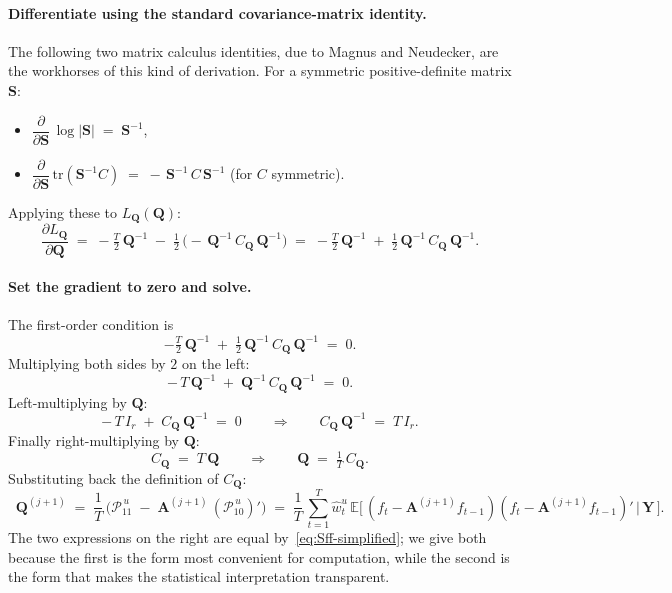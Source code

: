\documentclass[11pt, a4paper, oneside]{article}
\newcommand{\mY}{\mathbf{Y}}
\newcommand{\mA}{\mathbf{A}}
\newcommand{\mQ}{\mathbf{Q}}
\begin{document}
\paragraph{Differentiate using the standard covariance-matrix identity.}
The following two matrix calculus identities, due to Magnus and
Neudecker, are the workhorses of this kind of derivation. For a
symmetric positive-definite matrix $\mathbf{S}$:
\begin{itemize}[leftmargin=1.5em, itemsep=2pt]
    \item $\dfrac{\partial}{\partial \mathbf{S}}\, \log|\mathbf{S}| \;=\; \mathbf{S}^{-1}$,
    \item $\dfrac{\partial}{\partial \mathbf{S}}\, \mathrm{tr}(\mathbf{S}^{-1} C) \;=\; -\,\mathbf{S}^{-1}\, C\, \mathbf{S}^{-1}$ \quad (for $C$ symmetric).
\end{itemize}
Applying these to $L_{\mQ}(\mQ)$:
\[
\frac{\partial L_{\mQ}}{\partial \mQ}
\;=\; -\tfrac{T}{2}\, \mQ^{-1}
\;-\; \tfrac{1}{2}\,\big(-\, \mQ^{-1}\, C_{\mQ}\, \mQ^{-1}\big)
\;=\; -\tfrac{T}{2}\, \mQ^{-1} \;+\; \tfrac{1}{2}\, \mQ^{-1}\, C_{\mQ}\, \mQ^{-1}.
\]

\paragraph{Set the gradient to zero and solve.}
The first-order condition is
\[
-\tfrac{T}{2}\, \mQ^{-1} \;+\; \tfrac{1}{2}\, \mQ^{-1}\, C_{\mQ}\, \mQ^{-1} \;=\; 0.
\]
Multiplying both sides by $2$ on the left:
\[
-\, T\, \mQ^{-1} \;+\; \mQ^{-1}\, C_{\mQ}\, \mQ^{-1} \;=\; 0.
\]
Left-multiplying by $\mQ$:
\[
-\, T\, I_r \;+\; C_{\mQ}\, \mQ^{-1} \;=\; 0
\qquad\Longrightarrow\qquad
C_{\mQ}\, \mQ^{-1} \;=\; T\, I_r.
\]
Finally right-multiplying by $\mQ$:
\[
C_{\mQ} \;=\; T\, \mQ
\qquad\Longrightarrow\qquad
\mQ \;=\; \tfrac{1}{T}\, C_{\mQ}.
\]
Substituting back the definition of $C_{\mQ}$:
\begin{equation}
\boxed{\;\;
\mQ^{(j+1)} \;=\; \frac{1}{T}\, \Big(\mathcal{P}_{11}^{\,u} \;-\; \mA^{(j+1)}\, (\mathcal{P}_{10}^{\,u})'\Big)
\;=\; \frac{1}{T}\, \sum_{t=1}^{T} \hat{w}^u_t\, \mathbb{E}\!\big[\,(f_t - \mA^{(j+1)} f_{t-1})(f_t - \mA^{(j+1)} f_{t-1})' \,\big|\, \mY\,\big].
\;\;}
\label{eq:Q-update}
\end{equation}
The two expressions on the right are equal by~\eqref{eq:Sff-simplified};
we give both because the first is the form most convenient for
computation, while the second is the form that makes the statistical
interpretation transparent.
\end{document}
